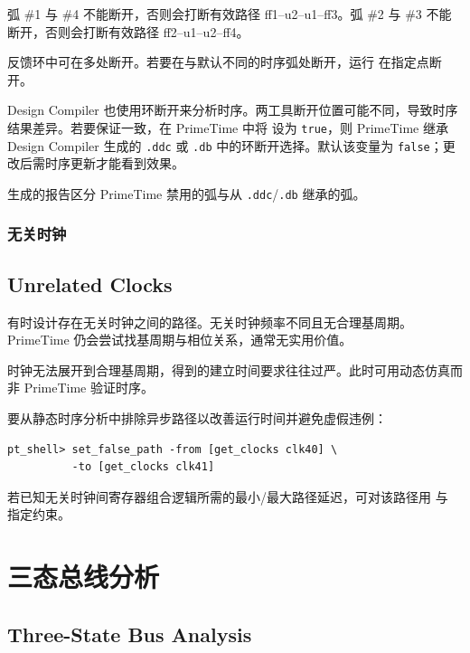 弧 \#1 与 \#4 不能断开，否则会打断有效路径 ff1--u2--u1--ff3。弧 \#2 与 \#3 不能断开，否则会打断有效路径 ff2--u1--u2--ff4。

反馈环中可在多处断开。若要在与默认不同的时序弧处断开，运行  在指定点断开。

Design Compiler 也使用环断开来分析时序。两工具断开位置可能不同，导致时序结果差异。若要保证一致，在 PrimeTime 中将  设为 \texttt{true}，则 PrimeTime 继承 Design Compiler 生成的 \texttt{.ddc} 或 \texttt{.db} 中的环断开选择。默认该变量为 \texttt{false}；更改后需时序更新才能看到效果。

 生成的报告区分 PrimeTime 禁用的弧与从 \texttt{.ddc}/\texttt{.db} 继承的弧。

\subsubsection{无关时钟}
\subsection*{Unrelated Clocks}

有时设计存在无关时钟之间的路径。无关时钟频率不同且无合理基周期。PrimeTime 仍会尝试找基周期与相位关系，通常无实用价值。


时钟无法展开到合理基周期，得到的建立时间要求往往过严。此时可用动态仿真而非 PrimeTime 验证时序。

要从静态时序分析中排除异步路径以改善运行时间并避免虚假违例：
\begin{lstlisting}
pt_shell> set_false_path -from [get_clocks clk40] \
          -to [get_clocks clk41]
\end{lstlisting}

若已知无关时钟间寄存器组合逻辑所需的最小/最大路径延迟，可对该路径用  与  指定约束。

\section{三态总线分析}
\subsection*{Three-State Bus Analysis}

